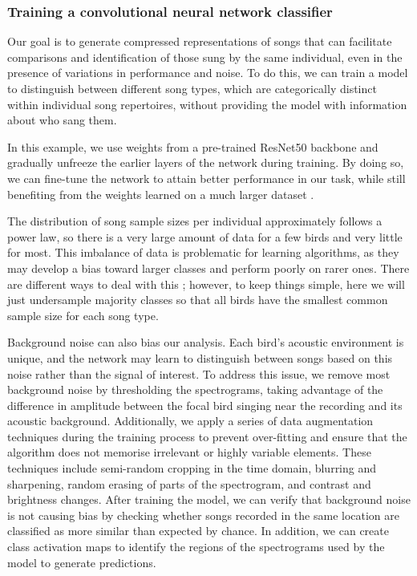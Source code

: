 
\subsubsection{Training a convolutional neural network classifier}
Our goal is to generate compressed representations of songs that can facilitate comparisons and identification of those sung by the same individual, even in the presence of variations in performance and noise. To do this, we can train a model to distinguish between different song types, which are categorically distinct within individual song repertoires, without providing the model with information about who sang them. 

In this example, we use weights from a pre-trained ResNet50 backbone \parencite{he2015} and gradually unfreeze the earlier layers of the network during training. By doing so, we can fine-tune the network to attain better performance in our task, while still benefiting from the weights learned on a much larger dataset \parencite{zhuang2021}. 

The distribution of song sample sizes per individual approximately follows a
power law, so there is a very large amount of data for a few birds and very
little for most. This imbalance of data is problematic for learning algorithms, as they may develop a bias toward larger classes and perform poorly on rarer ones. There are different ways to deal with this \parencite[see, e.g.,][]{krawczyk2016, thabtah2020}; however, to keep things simple, here we will just undersample majority classes so that all birds have the smallest common sample size for each song type.

Background noise can also bias our analysis. Each bird's acoustic environment is unique, and the network may learn to distinguish between songs based on this noise rather than the signal of interest. To address this issue, we remove most background noise by thresholding the spectrograms, taking advantage of the difference in amplitude between the focal bird singing near the recording and its acoustic background. Additionally, we apply a series of data augmentation techniques during the training process to prevent over-fitting and ensure that the algorithm does not memorise irrelevant or highly variable elements. These techniques include semi-random cropping in the time domain, blurring and sharpening, random erasing of parts of the spectrogram, and contrast and brightness changes. After training the model, we can verify that background noise is not causing bias by checking whether songs recorded in the same location are classified as more similar than expected by chance. In addition, we can create class activation maps to identify the regions of the spectrograms used by the model to generate predictions.

